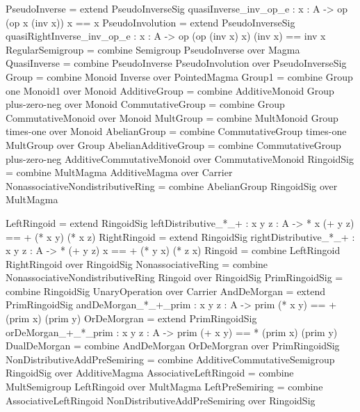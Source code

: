 \begin{togcode} 
PseudoInverse = 
  extend PseudoInverseSig {quasiInverse_inv_op_e : {x : A} -> 
       op (op x (inv x)) x == x}
PseudoInvolution = extend PseudoInverseSig
   {quasiRightInverse_inv_op_e : {x : A} -> 
        op (op (inv x) x) (inv x) == inv x}
RegularSemigroup = combine Semigroup {} PseudoInverse {} over Magma
QuasiInverse = 
  combine PseudoInverse {} PseudoInvolution {} 
  over PseudoInverseSig
Group  = combine Monoid {} Inverse {} over PointedMagma    
Group1 = combine Group one Monoid1 {} over Monoid
AdditiveGroup = 
  combine AdditiveMonoid {} Group plus-zero-neg over Monoid 
CommutativeGroup = combine Group {} CommutativeMonoid {} over Monoid
MultGroup = combine MultMonoid {} Group times-one over Monoid
AbelianGroup = 
  combine CommutativeGroup times-one MultGroup {} over Group
AbelianAdditiveGroup = 
  combine CommutativeGroup plus-zero-neg AdditiveCommutativeMonoid {} 
  over CommutativeMonoid 
RingoidSig = combine MultMagma {} AdditiveMagma {} over Carrier 
NonassociativeNondistributiveRing = 
  combine AbelianGroup {} RingoidSig {} over MultMagma 
\end{togcode} 

\begin{togcode} 
LeftRingoid  = 
  extend RingoidSig {leftDistributive_*_+  : {x y z : A} -> 
       * x (+ y z) == + (* x y) (* x z)}
RightRingoid = 
  extend RingoidSig {rightDistributive_*_+ : {x y z : A} -> 
       * (+ y z) x == + (* y x) (* z x)}
Ringoid = combine LeftRingoid {} RightRingoid {} over RingoidSig
NonassociativeRing = 
  combine NonassociativeNondistributiveRing {} Ringoid {} over RingoidSig
PrimRingoidSig = combine RingoidSig {} UnaryOperation {} over Carrier
AndDeMorgan = 
  extend PrimRingoidSig {andDeMorgan_*_+_prim : {x y z : A} -> 
       prim (* x y) == + (prim x) (prim y) }
OrDeMorgran = 
  extend PrimRingoidSig {orDeMorgan_+_*_prim  : {x y z : A} -> 
       prim (+ x y) == * (prim x) (prim y) }
DualDeMorgan = combine AndDeMorgan {} OrDeMorgran {} over PrimRingoidSig
NonDistributiveAddPreSemiring  = 
  combine AdditiveCommutativeSemigroup {} RingoidSig {} over AdditiveMagma  
AssociativeLeftRingoid = 
  combine MultSemigroup {} LeftRingoid {} over MultMagma 
LeftPreSemiring = 
  combine AssociativeLeftRingoid {} NonDistributiveAddPreSemiring {} 
  over RingoidSig 
\end{togcode} 

